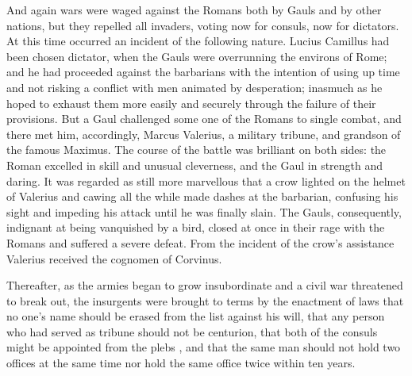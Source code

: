 And again wars were waged against the Romans both by Gauls and by other nations, but they repelled all invaders, voting now for consuls, now for dictators. At this time occurred an incident of the following nature. Lucius Camillus had been chosen dictator, when the Gauls were overrunning the environs of Rome; and he had proceeded against the barbarians with the intention of using up time and not risking a conflict with men animated by desperation; inasmuch as he hoped to exhaust them more easily and securely through the failure of their provisions. But a Gaul challenged some one of the Romans to single combat, and there met him, accordingly, Marcus Valerius, a military tribune, and grandson of the famous Maximus. The course of the battle was brilliant on both sides: the Roman excelled in skill and unusual cleverness, and the Gaul in strength and daring. It was regarded as still more marvellous that a crow lighted on the helmet of Valerius and cawing all the while made dashes at the barbarian, confusing his sight and impeding his attack until he was finally slain. The Gauls, consequently, indignant at being vanquished by a bird, closed at once in their rage with the Romans and suffered a severe defeat. From the incident of the crow's assistance Valerius received the cognomen of Corvinus.

Thereafter, as the armies began to grow insubordinate and a civil war threatened to break out, the insurgents were brought to terms by the enactment of laws that no one's name should be erased from the list against his will, that any person who had served as tribune should not be centurion, that both of the consuls might be appointed from the plebs , and that the same man should not hold two offices at the same time nor hold the same office twice within ten years.

